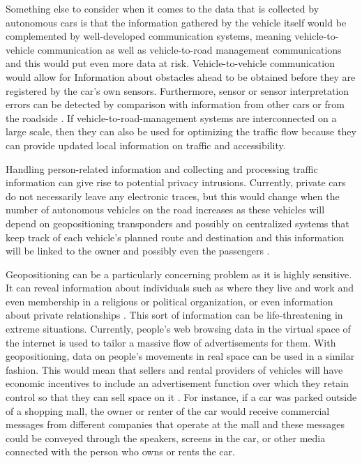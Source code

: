 \documentclass[10pt,twocolumn]{article}
\begin{document}
Something else to consider when it comes to the data that is collected by autonomous cars is that the information gathered by the vehicle itself would be complemented by well-developed communication systems, meaning vehicle-to-vehicle communication as well as vehicle-to-road management communications and this would put even more data at risk. Vehicle-to-vehicle communication would allow for Information about obstacles ahead to be obtained before they are registered by the car’s own sensors. Furthermore, sensor or sensor interpretation errors can be detected by comparison with information from other cars or from the roadside \cite{EthicalOverview}. If vehicle-to-road-management systems are interconnected on a large scale, then they can also be used for optimizing the traffic flow because they can provide updated local information on traffic and accessibility.

Handling person-related information and collecting and processing traffic information can give rise to potential privacy intrusions. Currently, private cars do not necessarily leave any electronic traces, but this would change when the number of autonomous vehicles on the road increases as these vehicles will depend on geopositioning transponders and possibly on centralized systems that keep track of each vehicle’s planned route and destination and this information will be linked to the owner and possibly even the passengers \cite{EthicalOverview}. 

Geopositioning can be a particularly concerning problem as it is highly sensitive. It can reveal information about individuals such as where they live and work and even membership in a religious or political organization, or even information about private relationships \cite{EthicalOverview}. This sort of information can be life-threatening in extreme situations. Currently, people’s web browsing data in the virtual space of the internet is used to tailor a massive flow of advertisements for them. With geopositioning, data on people’s movements in real space can be used in a similar fashion. This would mean that sellers and rental providers of vehicles will have economic incentives to include an advertisement function over which they retain control so that they can sell space on it \cite{EthicalOverview}. For instance, if a car was parked outside of a shopping mall, the owner or renter of the car would receive commercial messages from different companies that operate at the mall and these messages could be conveyed through the speakers, screens in the car, or other media connected with the person who owns or rents the car.
\end{document}
